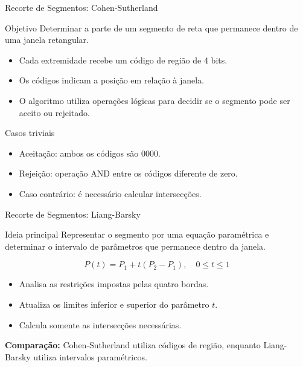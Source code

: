\documentclass[aspectratio=169,11pt]{beamer}
\begin{document}
\begin{frame}{Recorte de Segmentos: Cohen-Sutherland}
\begin{block}{Objetivo}
Determinar a parte de um segmento de reta que permanece
dentro de uma janela retangular.
\end{block}

\vspace{0.2cm}

\begin{itemize}
    \item Cada extremidade recebe um código de região de 4 bits.
    \item Os códigos indicam a posição em relação à janela.
    \item O algoritmo utiliza operações lógicas para decidir
    se o segmento pode ser aceito ou rejeitado.
\end{itemize}

\vspace{0.2cm}

\begin{block}{Casos triviais}
\begin{itemize}
    \item Aceitação: ambos os códigos são $0000$.
    \item Rejeição: operação AND entre os códigos diferente de zero.
    \item Caso contrário: é necessário calcular intersecções.
\end{itemize}
\end{block}
\end{frame}

\begin{frame}{Recorte de Segmentos: Liang-Barsky}
\begin{block}{Ideia principal}
Representar o segmento por uma equação paramétrica
e determinar o intervalo de parâmetros que permanece
dentro da janela.
\end{block}

\[
P(t)=P_1+t(P_2-P_1), \quad 0\leq t\leq 1
\]

\vspace{0.2cm}

\begin{itemize}
    \item Analisa as restrições impostas pelas quatro bordas.
    \item Atualiza os limites inferior e superior do parâmetro $t$.
    \item Calcula somente as intersecções necessárias.
\end{itemize}

\vspace{0.2cm}

\begin{center}
\textbf{Comparação:} Cohen-Sutherland utiliza códigos de região,
enquanto Liang-Barsky utiliza intervalos paramétricos.
\end{center}
\end{frame}
\end{document}
